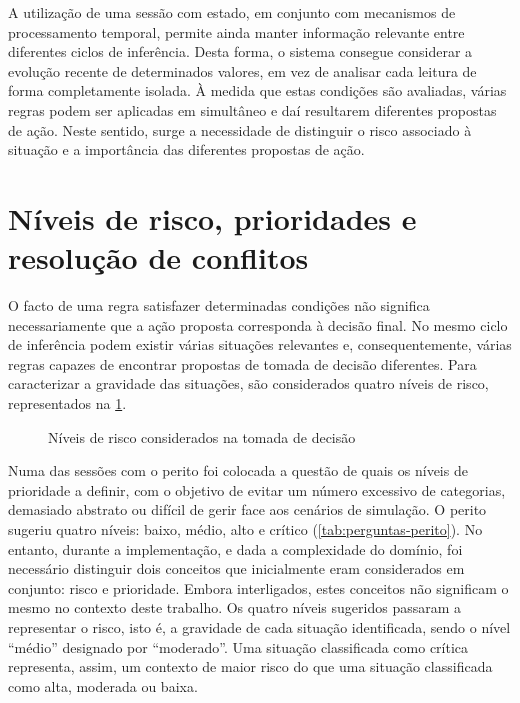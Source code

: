 A utilização de uma sessão com estado, em conjunto com mecanismos de
processamento temporal, permite ainda manter informação relevante entre
diferentes ciclos de inferência. Desta forma, o sistema consegue considerar a
evolução recente de determinados valores, em vez de analisar cada leitura de
forma completamente isolada. À medida que estas condições são avaliadas,
várias regras podem ser aplicadas em simultâneo e daí resultarem diferentes
propostas de ação. Neste sentido, surge a necessidade de distinguir o risco
associado à situação e a importância das diferentes propostas de ação.

\section{Níveis de risco, prioridades e resolução de conflitos}
\label{sec:prioridades}

O facto de uma regra satisfazer determinadas condições não significa
necessariamente que a ação proposta corresponda à decisão final. No mesmo
ciclo de inferência podem existir várias situações relevantes e,
consequentemente, várias regras capazes de encontrar propostas de tomada de
decisão diferentes. Para caracterizar a gravidade das situações, são
considerados quatro níveis de risco, representados na \cref{fig:niveis-risco}.

\begin{figure}[H]
  \centering
  \caption{Níveis de risco considerados na tomada de decisão}
  \label{fig:niveis-risco}
\end{figure}

Numa das sessões com o perito foi colocada a questão de quais os níveis de
prioridade a definir, com o objetivo de evitar um número excessivo de
categorias, demasiado abstrato ou difícil de gerir face aos cenários de
simulação. O perito sugeriu quatro níveis: baixo, médio, alto e crítico
(\cref{tab:perguntas-perito}). No entanto, durante a implementação, e dada a
complexidade do domínio, foi necessário distinguir dois conceitos que
inicialmente eram considerados em conjunto: risco e prioridade. Embora
interligados, estes conceitos não significam o mesmo no contexto deste
trabalho. Os quatro níveis sugeridos passaram a representar o risco, isto é, a
gravidade de cada situação identificada, sendo o nível \enquote{médio} designado por
\enquote{moderado}. Uma situação classificada como crítica representa, assim, um
contexto de maior risco do que uma situação classificada como alta, moderada
ou baixa.

